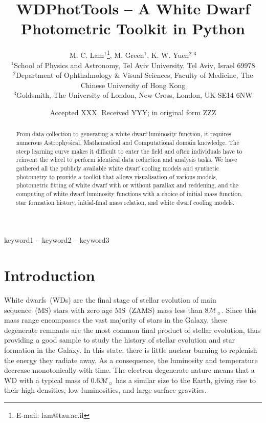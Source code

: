 \documentclass[fleqn,usenatbib]{rasti}
\title[WD Photometric Toolkit]{WDPhotTools -- A White Dwarf Photometric Toolkit in Python}
\author[M. C. Lam et al.]{
M. C. Lam$^{1}$\thanks{E-mail: lam@tau.ac.il},
M. Green$^{1}$,
K. W. Yuen$^{2, 3}$\\
$^{1}$School of Physics and Astronomy, Tel Aviv University, Tel Aviv, Israel 69978\\
$^{2}$Department of Ophthalmology \& Visual Sciences, Faculty of Medicine, The Chinese University of Hong Kong\\
$^{3}$Goldsmith, The University of London, New Cross, London, UK SE14 6NW
}
\date{Accepted XXX. Received YYY; in original form ZZZ}
\newcommand{\msun}{\mathcal{M}_{\sun}}
\begin{document}
\label{firstpage}
\pagerange{\pageref{firstpage}--\pageref{lastpage}}
\maketitle

\begin{abstract}
From data collection to generating a white dwarf luminosity function, it
requires numerous Astrophysical, Mathematical and Computational domain
knowledge. The steep learning curve makes it difficult to enter the field and
often individuals have to reinvent the wheel to perform identical data reduction
and analysis tasks. We have gathered all the publicly available white dwarf
cooling models and synthetic photometry to provide a toolkit that allows
visualisation of various models, photometric fitting of white dwarf with or
without parallax and reddening, and the computing of white dwarf luminosity
functions with a choice of initial mass function, star formation history,
initial-final mass relation, and white dwarf cooling models.

\end{abstract}

\begin{keywords}
keyword1 -- keyword2 -- keyword3
\end{keywords}


\section{Introduction}
White dwarfs~(WDs) are the final stage of stellar evolution of main
sequence~(MS) stars with zero age MS~(ZAMS) mass less than $8\msun$. Since this
mass range encompasses the vast majority of stars in the Galaxy, these
degenerate remnants are the most common final product of stellar evolution,
thus providing a good sample to study the history of stellar evolution and star
formation in the Galaxy. In this state, there is little nuclear burning to
replenish the energy they radiate away. As a consequence, the luminosity and
temperature decrease monotonically with time. The electron degenerate nature
means that a WD with a typical mass of $0.6\mathcal{M}_{\sun}$ has a similar
size to the Earth, giving rise to their high densities, low luminosities, and
large surface gravities.
\end{document}
